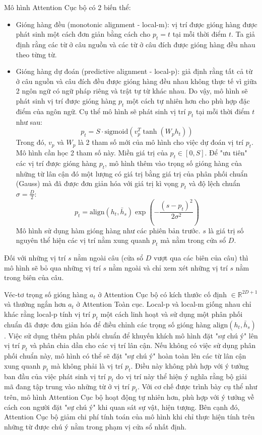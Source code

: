 Mô hình Attention Cục bộ có 2 biến thể:
\begin{itemize}
	\item Gióng hàng đều (monotonic alignment - local-m): vị trí được gióng hàng được phát sinh một cách đơn giản bằng cách cho $p_t = t$ tại mỗi thời điểm $t$. Ta giả định rằng các từ ở câu nguồn và các từ ở câu đích được gióng hàng đều nhau theo từng từ.
	\item Gióng hàng dự đoán (predictive alignment - local-p): giả định rằng tất cả từ ở câu nguồn và câu đích đều được gióng hàng đều nhau không thực tế vì giữa 2 ngôn ngữ có ngữ pháp riêng và trật tự từ khác nhau. Do vậy, mô hình sẽ phát sinh vị trí được gióng hàng $p_t$ một cách tự nhiên hơn cho phù hợp đặc điểm của ngôn ngữ. Cụ thể mô hình sẽ phát sinh vị trí $p_t$ tại mỗi thời điểm $t$ như sau:
	\begin{equation}
	p_t = S \cdot \text{sigmoid} (v^T_p \tanh(W_p h_t))
	\end{equation}
	Trong đó, $v_p$ và $W_p$ là 2 tham số mới của mô hình cho việc dự đoán vị trí $p_t$. Mô hình cần học 2 tham số này. Miền giá trị của $p_t \in [0, S]$.
	Để "ưu tiên" các vị trí được gióng hàng $p_t$, mô hình thêm vào trọng số gióng hàng của những từ lân cận đó một lượng có giá trị bằng giá trị của phân phối chuẩn (Gauss) mà đã được đơn giản hóa với giá trị kì vọng $p_t$ và độ lệch chuẩn $\sigma = \frac{D}{2}$:
	\begin{equation}
	p_t = \text{align}(h_t, \bar{h}_s)\exp\left(-\frac{(s-p_t)^2}{2\sigma^2}\right)
	\end{equation}
	Mô hình sử dụng hàm gióng hàng như các phiên bản trước. $s$ là giá trị số nguyên thể hiện các vị trí nằm xung quanh $p_t$ mà nằm trong cửa sổ $D$.
\end{itemize}
 Đối với những vị trí $s$ nằm ngoài câu (cửa sổ $D$ vượt qua các biên của câu) thì mô hình sẽ bỏ qua những vị trí $s$ nằm ngoài và chỉ xem xét những vị trí $s$ nằm trong biên của câu.
 
 Véc-tơ trọng số gióng hàng $a_t$ ở Attention Cục bộ có kích thước cố định $\in \mathbb{R}^{2D + 1}$ và thường ngắn hơn $a_t$ ở Attention Toàn cục. Local-p và local-m giống nhau chỉ khác rằng local-p tính vị trí $p_t$ một cách linh hoạt và sử dụng một phân phối chuẩn đã được đơn giản hóa để điều chỉnh các trọng số gióng hàng $\text{align}(h_t, \bar{h}_s)$. Việc sử dụng thêm phân phối chuẩn để khuyến khích mô hình đặt "sự chú ý" lên vị trí $p_t$ và phân chia dần cho các vị trí lân cận. Nếu không có việc sử dụng phân phối chuẩn này, mô hình có thể sẽ đặt "sự chú ý" hoàn toàn lên các từ lân cận xung quanh $p_t$ mà không phải là vị trí $p_t$. Điều này không phù hợp với ý tưởng ban đầu của việc phát sinh vị trí $p_t$ do vị trí này thể hiện ý nghĩa rằng bộ giải mã đang tập trung vào những từ ở vị trí $p_t$.
Với cơ chế được trình bày cụ thể như trên, mô hình Attention Cục bộ hoạt động tự nhiên hơn, phù hợp với ý tưởng về cách con người đặt "sự chú ý" khi quan sát sự vật, hiện tượng. Bên cạnh đó, Attention Cục bộ giảm chi phí tính toán của mô hình khi chỉ thực hiện tính trên những từ được chú ý nằm trong phạm vị cửa sổ nhất định.

